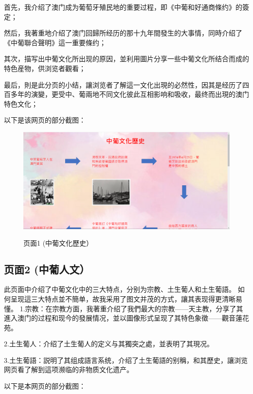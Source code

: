 \documentclass[supercite]{Experimental_Report}
\theoremstyle{definition}
\begin{document}
	首先，我介绍了澳门成为葡萄牙殖民地的重要过程，即《中葡和好通商條约》的簽定；
	
	然后，我著重地介绍了澳门回歸所经历的那十九年間發生的大事情，同時介绍了《中葡聯合聲明》這一重要條约；
	
	其次，描写出中葡文化所出现的原因，並利用圖片分享一些中葡文化所结合而成的特色産物，供浏览者觀看；
	
	最后，則是此分页的小结，讓浏览者了解這一文化出現的必然性，因其是经历了四百多年的演變，更受中、葡兩地不同文化彼此互相影响和吸收，最终而出現的澳门特色文化；
	
	以下是该网页的部分截图：
	\begin{figure}[htb] %
		\begin{center}
			\includegraphics[scale=0.40]{images/3-1.jpg}
			\label{fig3-1}
			\caption{页面1 (中葡文化歷史）}
		\end{center}
	\end{figure}
	
	\newpage
	
	
	\subsection{页面2 (中葡人文）}
	此页面中介绍了中葡文化中的三大特点，分别为宗教、土生葡人和土生葡語。
	如何呈现這三大特点並不簡单，故我采用了图文并茂的方式，讓其表现得更清晰易懂。
	1.宗教：在宗教方面，我著重介绍了我們最大的宗教——天主教，分享了其進入澳门的过程和现今的發展情况，並以圖像形式呈现了其特色象徵——觀音蓮花苑。
	
	2.土生葡人：介绍了土生葡人的定义与其獨突之處，並表明了其現况。
	
	3.土生葡語：説明了其组成語言系统，介绍了土生葡語的别稱，和其歷史，讓浏览网页看了解到這项濒临的非物质文化遗产。
	
	以下是本网页的部分截图：
	
\end{document}
